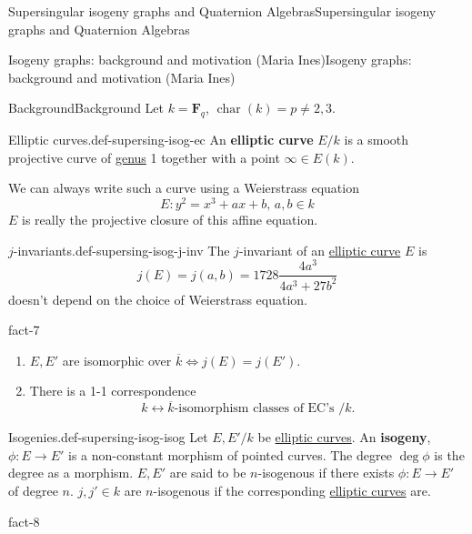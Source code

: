 \documentclass[10pt,]{book}
\newcommand{\terminology}[1]{\textbf{#1}}
\numberwithin{equation}{section}
\newcommand{\FF}{\mathbf{F}}
\DeclareMathOperator{\characteristic}{char}
\begin{document}
\begin{chapterptx}{Supersingular isogeny graphs and Quaternion Algebras}{}{Supersingular isogeny graphs and Quaternion Algebras}{}{}
\begin{sectionptx}{Isogeny graphs: background and motivation (Maria Ines)}{}{Isogeny graphs: background and motivation (Maria Ines)}{}{}
\begin{subsectionptx}{Background}{}{Background}{}{}
\hypertarget{p-786}{}%
Let \(k = \FF_q\), \(\characteristic (k) = p \ne 2,3\).%
\begin{definition}{Elliptic curves.}{def-supersing-isog-ec}%
\hypertarget{p-787}{}%
An \terminology{elliptic curve} \(E/k\) is a smooth projective curve of \hyperref[def-class-set]{genus} 1 together with a point \(\infty \in E(k)\).%
\end{definition}
\hypertarget{p-788}{}%
We can always write such a curve using a Weierstrass equation%
\begin{equation*}
E\colon y^2=  x^3  + ax  +b,\,a,b    \in k
\end{equation*}
\(E\) is really the projective closure of this affine equation.%
\begin{definition}{\(j\)-invariants.}{def-supersing-isog-j-inv}%
\hypertarget{p-789}{}%
The \(j\)-invariant of an \hyperref[def-supersing-isog-ec]{elliptic curve} \(E\) is%
\begin{equation*}
j(E) = j(a,b) = 1728 \frac{4a^3}{4a^3 + 27b^2}
\end{equation*}
doesn't depend on the choice of Weierstrass equation.%
\end{definition}
\begin{fact}{}{}{fact-7}%
\hypertarget{p-790}{}%
\leavevmode%
\begin{enumerate}
\item\hypertarget{li-182}{}\(E,E'\) are isomorphic over \(\overline k \iff j(E)  = j(E')\).%
\item\hypertarget{li-183}{}There is a 1-1 correspondence%
\begin{equation*}
k \leftrightarrow \overline k \text{-isomorphism classes of EC's }/k\text{.}
\end{equation*}
%
\end{enumerate}
%
\end{fact}
\begin{definition}{Isogenies.}{def-supersing-isog-isog}%
\hypertarget{p-791}{}%
Let \(E,E'/k\) be \hyperref[def-supersing-isog-ec]{elliptic curves}. An \terminology{isogeny}, \(\phi \colon E\to E'\) is a non-constant morphism of pointed curves. The degree \(\deg \phi \) is the degree as a morphism. \(E,E'\) are said to be \(n\)-isogenous if there exists \(\phi\colon E\to E'\) of degree \(n\). \(j,j'\in k\) are \(n\)-isogenous if the corresponding \hyperref[def-supersing-isog-ec]{elliptic curves} are.%
\end{definition}
\begin{fact}{}{}{fact-8}%
\hypertarget{p-792}{}%
\leavevmode%

\end{fact}
\end{subsectionptx}
\end{sectionptx}
\end{chapterptx}
\end{document}
